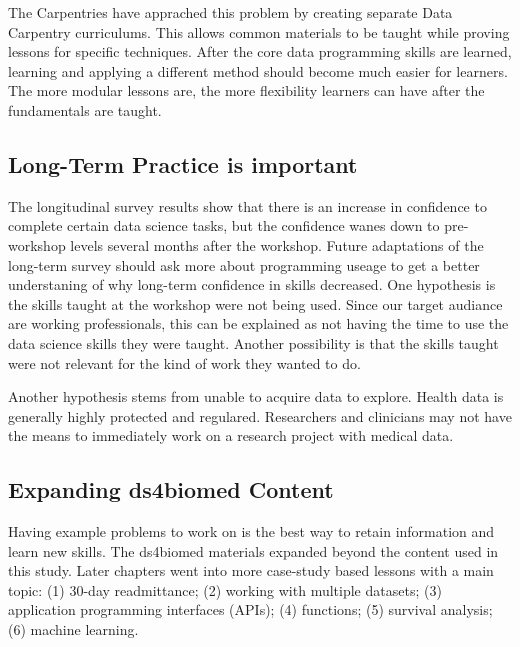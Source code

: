 \documentclass[030-workshop.tex]{subfiles}
\begin{document}
        The Carpentries have apprached this problem by creating separate Data Carpentry curriculums.
        This allows common materials to be taught while proving lessons for specific techniques.
        After the core data programming skills are learned,
        learning and applying a different method should become much easier for learners.
        The more modular lessons are, the more flexibility learners can have after the fundamentals are taught.

    \subsection{Long-Term Practice is important}

        The longitudinal survey results show that there is an increase in confidence to complete certain data science tasks,
        but the confidence wanes down to pre-workshop levels several months after the workshop.
        Future adaptations of the long-term survey should ask more about programming useage to get a better understaning
        of why long-term confidence in skills decreased.
        One hypothesis is the skills taught at the workshop were not being used.
        Since our target audiance are working professionals,
        this can be explained as not having the time to use the data science skills they were taught.
        Another possibility is that the skills taught were not relevant for the kind of work they wanted to do.

        Another hypothesis stems from unable to acquire data to explore.
        Health data is generally highly protected and regulared.
        Researchers and clinicians may not have the means to immediately work on a research project with medical data.

        \subsection{Expanding ds4biomed Content}

            Having example problems to work on is the best way to retain information and learn new skills.
            The ds4biomed materials expanded beyond the content used in this study.
            Later chapters went into more case-study based lessons with a main topic:
            (1) 30-day readmittance;
            (2) working with multiple datasets;
            (3) application programming interfaces (APIs);
            (4) functions;
            (5) survival analysis;
            (6) machine learning.
\end{document}
